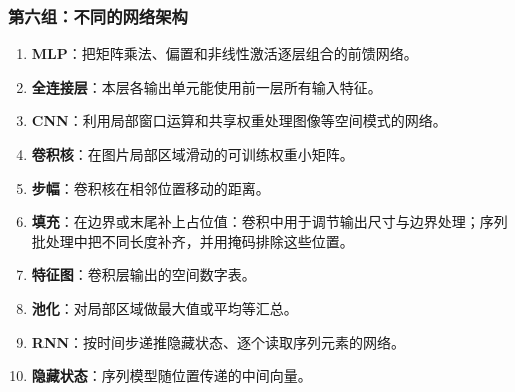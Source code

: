 \subsubsection{第六组：不同的网络架构}
\begin{enumerate}[leftmargin=2.5em,itemsep=4pt,start=51]
\item \textbf{MLP}：把矩阵乘法、偏置和非线性激活逐层组合的前馈网络。 
\item \textbf{全连接层}：本层各输出单元能使用前一层所有输入特征。 
\item \textbf{CNN}：利用局部窗口运算和共享权重处理图像等空间模式的网络。 
\item \textbf{卷积核}：在图片局部区域滑动的可训练权重小矩阵。 
\item \textbf{步幅}：卷积核在相邻位置移动的距离。 
\item \textbf{填充}：在边界或末尾补上占位值：卷积中用于调节输出尺寸与边界处理；序列批处理中把不同长度补齐，并用掩码排除这些位置。 
\item \textbf{特征图}：卷积层输出的空间数字表。 
\item \textbf{池化}：对局部区域做最大值或平均等汇总。 
\item \textbf{RNN}：按时间步递推隐藏状态、逐个读取序列元素的网络。 
\item \textbf{隐藏状态}：序列模型随位置传递的中间向量。 
\end{enumerate}

